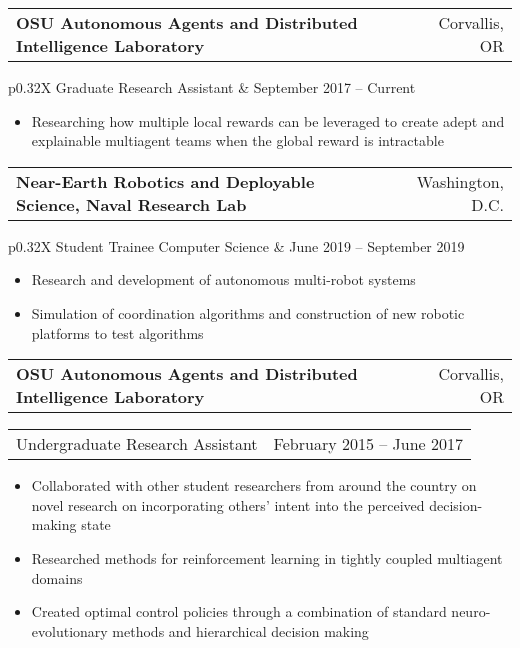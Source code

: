 \documentclass[letterpaper,10pt,titlepage]{article}
\newcommand{\leftW}{0.32\textwidth}
\begin{document}
\begin{tabularx}{\linewidth}{Xr}
	\textbf{OSU Autonomous Agents and Distributed Intelligence Laboratory} & Corvallis, OR\\
\end{tabularx}
\begin{tabularx}{\linewidth}{p{\leftW}X}
	Graduate Research Assistant          & September 2017 -- Current\\
\end{tabularx}
\begin{itemize} \itemsep1pt \parskip0pt 
	\item Researching how multiple local rewards can be leveraged to create adept and explainable multiagent teams when the global reward is intractable
\end{itemize}

\begin{tabularx}{\linewidth}{Xr}
	\textbf{Near-Earth Robotics and Deployable Science, Naval Research Lab} & Washington, D.C.\\
\end{tabularx}
\begin{tabularx}{\linewidth}{p{\leftW}X}
	Student Trainee Computer Science & June 2019 -- September 2019\\
\end{tabularx}
\begin{itemize} \itemsep1pt \parskip0pt 
	\item Research and development of autonomous multi-robot systems
	\item Simulation of coordination algorithms and construction of new robotic platforms to test algorithms
\end{itemize}



\begin{tabularx}{\linewidth}{Xr}
	\textbf{OSU Autonomous Agents and Distributed Intelligence Laboratory} & Corvallis, OR\\
\end{tabularx}
\begin{tabularx}{\linewidth}{p{\leftW}X}
Undergraduate Research Assistant          & February 2015 -- June 2017\\
\end{tabularx}
\begin{itemize} \itemsep1pt \parskip0pt 
\item Collaborated with other student researchers from around the country on novel research on incorporating others' intent into the perceived decision-making state
\item Researched methods for reinforcement learning in tightly coupled multiagent domains
\item Created optimal control policies through a combination of standard neuro-evolutionary methods and hierarchical decision making
\end{itemize}
\end{document}
